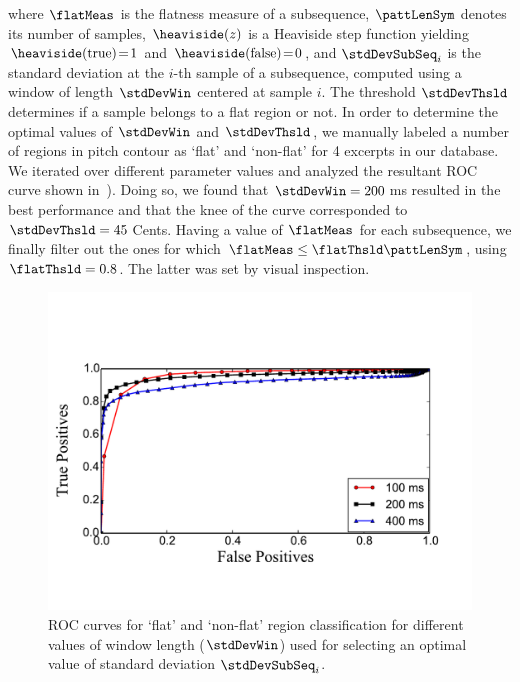 \noindent where $\flatMeas$ is the flatness measure of a subsequence, $\pattLenSym$ denotes its number of samples, $\heaviside(z)$ is a Heaviside step function yielding $\heaviside(\text{true})\!=\!1$ and $\heaviside(\text{false})\!=\!0$, and $\stdDevSubSeq_i$ is the standard deviation at the $i$-th sample of a subsequence, computed using a window of length $\stdDevWin$ centered at sample $i$. The threshold $\stdDevThsld$ determines if a sample belongs to a flat region or not. In order to determine the optimal values of $\stdDevWin$ and $\stdDevThsld$, we manually labeled a number of regions in pitch contour as `flat' and `non-flat' for 4 excerpts in our database. We iterated over different parameter values and analyzed the resultant ROC curve shown in~). %
Doing so, we found that $\stdDevWin=200$\,ms resulted in the best performance and that the knee of the curve corresponded to $\stdDevThsld=45$\,Cents. Having a value of $\flatMeas$ for each subsequence, we finally filter out the ones for which $\flatMeas \leq \flatThsld \pattLenSym$, using $\flatThsld = 0.8$. The latter was set by visual inspection.

\begin{figure}
	\begin{center}
		\includegraphics[width=\figSizeEightyFive]{ch06_patterns/figures/discovery/ROCFlatness.pdf}
	\end{center}
	\caption[ROC curve for `flat' and `non-flat' region classification]{ROC curves for `flat' and `non-flat' region classification for different values of window length ($\stdDevWin$) used for selecting an optimal value of standard deviation $\stdDevSubSeq_i$.}
	\label{fig:ROC_pattern_discovery}
\end{figure}

